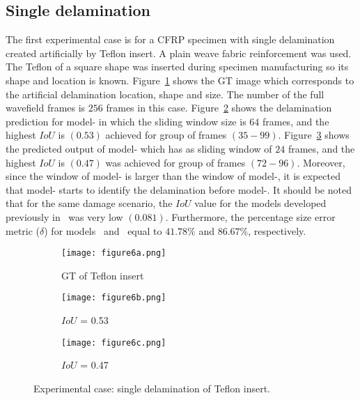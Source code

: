 \subsection{Single delamination}
The first experimental case is for a CFRP specimen with single delamination created artificially by Teflon insert. 
A plain weave fabric reinforcement was used.
The Teflon of a square shape was inserted during specimen manufacturing so its shape and location is known.
Figure~\ref{fig:exp_CFRP_teflon_3o_GT} shows the GT image which corresponds to the artificial delamination location, shape and size.
The number of the full wavefield frames is \(256\) frames in this case.
Figure~\ref{fig:model_1_CFRP_teflon_3o} shows the delamination prediction for model- in which the sliding window size is \(64\) frames, and the highest \(IoU\) is \((0.53)\) achieved for group of frames \((35-99)\).
Figure~\ref{fig:model_2_CFRP_teflon_3o} shows the predicted output of model- which has as sliding window of \(24\) frames, and the highest \(IoU\) is \((0.47)\) was achieved for group of frames \((72-96)\).
Moreover, since the window of model- is larger than the window of model-, it is expected that model- starts to identify the delamination before model-.
It should be noted that for the same damage scenario, the \(IoU\) value for the models developed previously in~\cite{Ijjeh2021} was very low \((0.081)\).
Furthermore, the percentage size error metric (\(\delta\)) for models~ and~ equal to \(41.78 \%\) and \(86.67\%\), respectively.
\begin{figure} [!h]
	\centering
	\begin{subfigure}[b]{0.32\textwidth}
		\centering
		\texttt{[image: figure6a.png]}
		\caption{GT of Teflon insert}
		\label{fig:exp_CFRP_teflon_3o_GT}
	\end{subfigure}
	\hfill
	\begin{subfigure}[b]{0.32\textwidth}
		\centering
		\texttt{[image: figure6b.png]}
		\caption{\(IoU\) = 0.53 } 
		\label{fig:model_1_CFRP_teflon_3o}
	\end{subfigure}
	\hfill
	\begin{subfigure}[b]{0.32\textwidth}
		\centering
		\texttt{[image: figure6c.png]}
		\caption{\(IoU\) = 0.47}
		\label{fig:model_2_CFRP_teflon_3o}
	\end{subfigure}
	\caption{Experimental case: single delamination of Teflon insert.}
	\label{fig:exp_Teflon_insert}
\end{figure} 
